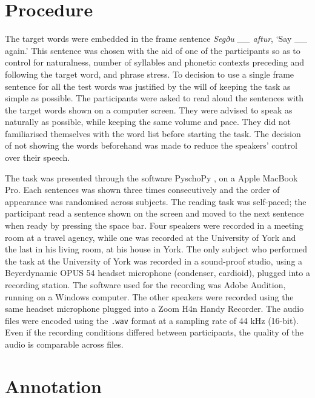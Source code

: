\documentclass[11pt,a4paper,openany]{memoir}\usepackage[]{graphicx}\usepackage[]{color}
\begin{document}


\section{Procedure}
\label{s:procedure}
The target words were embedded in the frame sentence \textit{Segðu \_\_ aftur}, `Say \_\_ again.'
This sentence was chosen with the aid of one of the participants so as to control for naturalness, number of syllables and phonetic contexts preceding and following the target word, and phrase stress.
To decision to use a single frame sentence for all the test words was justified by the will of keeping the task as simple as possible.
The participants were asked to read aloud the sentences with the target words shown on a computer screen.
They were advised to speak as naturally as possible, while keeping the same volume and pace.
They did not familiarised themselves with the word list before starting the task.
The decision of not showing the words beforehand was made to reduce the speakers' control over their speech.

The task was presented through the software PyschoPy \citep{peirce2009}, on a Apple MacBook Pro.
Each sentences was shown three times consecutively and the order of appearance was randomised across subjects.
The reading task was self-paced; the participant read a sentence shown on the screen and moved to the next sentence when ready by pressing the space bar.
Four speakers were recorded in a meeting room at a travel agency, while one was recorded at the University of York and the last in his living room, at his house in York.
The only subject who performed the task at the University of York was recorded in a sound-proof studio, using a Beyerdynamic OPUS 54 headset microphone (condenser, cardioid), plugged into a recording station.
The software used for the recording was Adobe Audition, running on a Windows computer.
The other speakers were recorded using the same headset microphone plugged into a Zoom H4n Handy Recorder.
The audio files were encoded using the \texttt{.wav} format at a sampling rate of 44 kHz (16-bit).
Even if the recording conditions differed between participants, the quality of the audio is comparable across files.

\section{Annotation}
\label{s:annotation}
\end{document}
